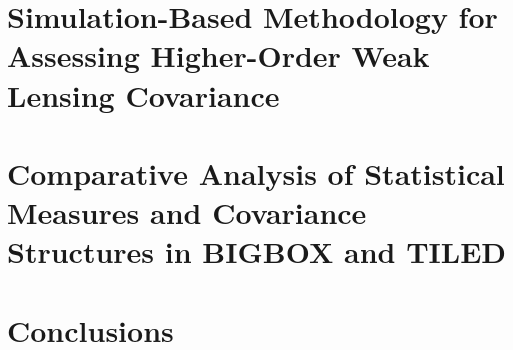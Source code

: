 \documentclass[11pt,a4paper]{ipmu}
\begin{document}
\chapter{Simulation-Based Methodology for Assessing Higher-Order Weak Lensing Covariance}
\label{chap:methods}
\minitoc 


\chapter{Comparative Analysis of Statistical Measures and Covariance Structures in BIGBOX and TILED}
\label{chap:results}
\minitoc 


\chapter{Conclusions}
\label{chap:conclusions}




\backmatter


\end{document}
